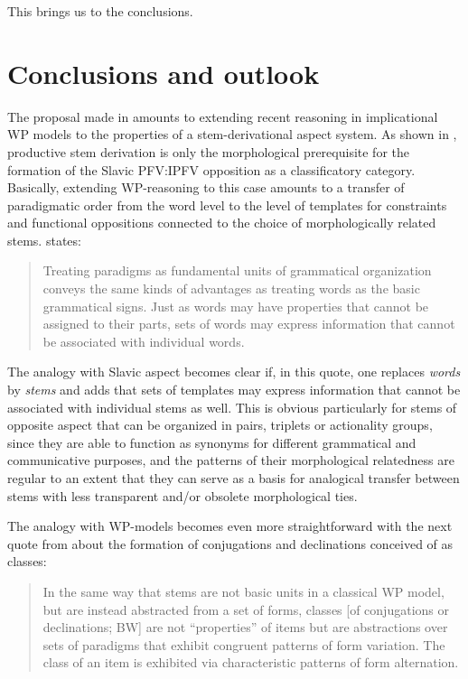 \documentclass[output=paper]{langscibook}
\begin{document}
This brings us to the conclusions.

\section{Conclusions and outlook}\label{wiemer:6}

The proposal made in  amounts to extending recent reasoning in implicational WP models to the properties of a stem-derivational aspect system. As shown in , productive stem derivation is only the morphological prerequisite for the formation of the Slavic PFV:IPFV opposition as a classificatory category. Basically, extending WP-reasoning to this case amounts to a transfer of paradigmatic order from the word level to the level of templates for constraints and functional oppositions connected to the choice of morphologically related stems. \citet[75]{Blevins2016} states:

\begin{quote}
Treating paradigms as fundamental units of grammatical organization conveys the same  kinds of advantages as treating words as the basic grammatical signs. Just as words may have properties that cannot be assigned to their parts, sets of words may express information that cannot be associated with individual words.
\end{quote}

The analogy with Slavic aspect becomes clear if, in this quote, one replaces \textit{words} by \textit{stems} and adds that sets of templates may express information that cannot be associated with individual stems as well. This is obvious particularly for stems of opposite aspect that can be organized in pairs, triplets or actionality groups, since they are able to function as synonyms for different grammatical and communicative purposes, and the patterns of their morphological relatedness are regular to an extent that they can serve as a basis for analogical transfer between stems with less transparent and/or obsolete morphological ties.

The analogy with WP-models becomes even more straightforward with the next quote from \citet[80]{Blevins2016} about the formation of conjugations and declinations conceived of as classes:


\begin{quote}
In the same way that stems are not basic units in a classical WP model, but are instead abstracted from a set of forms, classes [of conjugations or declinations; BW] are not ``properties'' of items but are abstractions over sets of paradigms that exhibit congruent patterns of form variation. The class of an item is exhibited via characteristic patterns of form alternation.
\end{quote}
\end{document}
